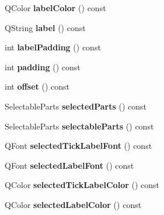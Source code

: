 \begin{DoxyCompactItemize}
\item 
Q\+Color {\bfseries label\+Color} () const \hypertarget{class_q_c_p_axis_a7854c2875e3b8d86b210d108bd87aeb9}{}\label{class_q_c_p_axis_a7854c2875e3b8d86b210d108bd87aeb9}

\item 
Q\+String {\bfseries label} () const \hypertarget{class_q_c_p_axis_ab3486dca5a6e9e3ca0e32678272ba549}{}\label{class_q_c_p_axis_ab3486dca5a6e9e3ca0e32678272ba549}

\item 
int {\bfseries label\+Padding} () const \hypertarget{class_q_c_p_axis_a59c9a0e362dec811491fc9a0709d2afa}{}\label{class_q_c_p_axis_a59c9a0e362dec811491fc9a0709d2afa}

\item 
int {\bfseries padding} () const \hypertarget{class_q_c_p_axis_abb85015a9467ec176e70698307ec833a}{}\label{class_q_c_p_axis_abb85015a9467ec176e70698307ec833a}

\item 
int {\bfseries offset} () const \hypertarget{class_q_c_p_axis_aebc032ac6eea164a02859c017f52d5e7}{}\label{class_q_c_p_axis_aebc032ac6eea164a02859c017f52d5e7}

\item 
Selectable\+Parts {\bfseries selected\+Parts} () const \hypertarget{class_q_c_p_axis_a08323248a1cba4750ef07ceea159e0b3}{}\label{class_q_c_p_axis_a08323248a1cba4750ef07ceea159e0b3}

\item 
Selectable\+Parts {\bfseries selectable\+Parts} () const \hypertarget{class_q_c_p_axis_ad2bff3d2ed3d35c10d44c0c02441bd2c}{}\label{class_q_c_p_axis_ad2bff3d2ed3d35c10d44c0c02441bd2c}

\item 
Q\+Font {\bfseries selected\+Tick\+Label\+Font} () const \hypertarget{class_q_c_p_axis_ae245bb3dcd0ec71eee38437de6e719f7}{}\label{class_q_c_p_axis_ae245bb3dcd0ec71eee38437de6e719f7}

\item 
Q\+Font {\bfseries selected\+Label\+Font} () const \hypertarget{class_q_c_p_axis_a078bbc88b33595a5308350c2889c96d4}{}\label{class_q_c_p_axis_a078bbc88b33595a5308350c2889c96d4}

\item 
Q\+Color {\bfseries selected\+Tick\+Label\+Color} () const \hypertarget{class_q_c_p_axis_a5a3af4bd1a820bb7c6d4c85e1d8d452f}{}\label{class_q_c_p_axis_a5a3af4bd1a820bb7c6d4c85e1d8d452f}

\item 
Q\+Color {\bfseries selected\+Label\+Color} () const \hypertarget{class_q_c_p_axis_a8cf8de6ac7f1ca617e05412f669ed229}{}\label{class_q_c_p_axis_a8cf8de6ac7f1ca617e05412f669ed229}


\end{DoxyCompactItemize}
